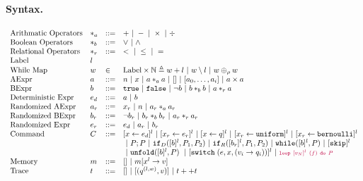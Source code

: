\documentclass[a4paper,11pt]{article}
\begin{document}
\paragraph{Syntax.}
\[
\begin{array}{llll}
 \mbox{Arithmatic Operators} & *_a & ::= & + ~|~ - ~|~ \times 
%
~|~ \div \\  
  \mbox{Boolean Operators} & *_b & ::= & \lor \sep \land \\
   \mbox{Relational Operators} & *_r & ::= & < ~|~ \leq ~|~ = \\  
 \mbox{Label} & l & & \\ 
 \mbox{While Map} & w & \in & \mbox{Label} \times \mathbb{N} \triangleq w +l \sep w \setminus l \sep w \oplus_\rho w \\
\mbox{AExpr} & \aexpr & ::= & 
  n ~|~ x ~|~ \aexpr *_a \aexpr ~|~ {[] ~|~ [\aexpr_0, \dots, \aexpr_i] \sep \aexpr \times \aexpr } \\
\mbox{BExpr} & \bexpr & ::= & 
  \etrue ~|~ \efalse  ~|~ \neg \bexpr
   ~|~ \bexpr *_b \bexpr
  ~|~ \aexpr *_r \aexpr \\
\mbox{Deterministic Expr} & \expr_d & ::= & \aexpr \sep \bexpr \\
\mbox{Randomized AExpr} & \aexpr_r & ::= & 
   x_r \sep n \sep  \aexpr_r *_a \aexpr_r \\
\mbox{Randomized BExpr} & \bexpr_r & ::= & 
\neg \bexpr_r
   ~|~ \bexpr_r *_b \bexpr_r
  ~|~ \aexpr_r *_r \aexpr_r \\
\mbox{Randomized Expr} & \expr_r & ::=  & \expr_d \sep \aexpr_r \sep \bexpr_r \\
\mbox{Command} & C & ::= &   [\assign x {\expr_d}]^{l} \sep [\assign {x_r} {\expr_r}]^{l} \sep  [\assign x q]^{l} \sep  [\assign {x_r} \uniform ]^{l} \sep   [\assign {x_r} \bernoulli]^{l} 
\\
& & & ~|~  \command ; \command  ~|~ \eif_D ([\bexpr]^{l}, \command_1, \command_2) \sep  \eif_R ([\bexpr_r]^{l}, \command_1, \command_2) 
  ~|~ \ewhile([\bexpr]^{l}, \command) ~|~ [\eskip]^{l} \\
& & & ~|~ {\eunfold{[\bexpr]^{l}}{\command} \sep [\eswitch( \expr, x, (v_i \to  q_i))]^{l}} \sep \jl{\eloop ~ [\valr_N]^{l} ~ (f) ~ \edo ~ \command }
  \\
\mbox{Memory} & m & ::= & [] ~|~ m[x^{l} \to v] \\
%
\mbox{Trace} & t & ::= & [] ~|~ [(q ^{(l, w) }, v)] ~|~ t ++ t
\end{array}
\]
\end{document}
